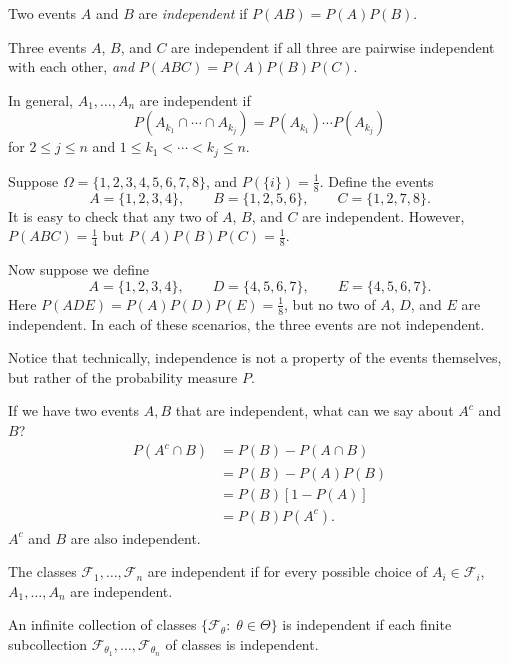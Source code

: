\documentclass[11pt,fleqn]{book} %
\begin{document}
\begin{definition} \label{def:independent-events}
	Two events $A$ and $B$ are \emph{independent} if $P(AB) = P(A)P(B)$.

	Three events $A$, $B$, and $C$ are independent if all three are pairwise independent with each other, \emph{and} $P(ABC)=P(A)P(B)P(C)$.

	In general, $A_1,\dots,A_n$ are independent if
	\[
		P \left( A_{k_1} \cap \cdots \cap A_{k_j} \right) = P \left( A_{k_1} \right) \cdots P \left( A_{k_j} \right)
	\]
	for $2 \leq j \leq n$ and $1 \leq k_1 < \cdots < k_j \leq n$.
\end{definition}

\begin{example} \label{ex:not-independent}
	Suppose $\Omega = \{1,2,3,4,5,6,7,8\}$, and $P(\{i\}) = \frac{1}{8}$. Define the events
	\[
		A = \{1,2,3,4\}, \qquad B = \{1,2,5,6\}, \qquad C = \{1,2,7,8\}.
	\]
	It is easy to check that any two of $A$, $B$, and $C$ are independent. However, $P(ABC) = \frac{1}{4}$ but $P(A)P(B)P(C) = \frac{1}{8}$.

	Now suppose we define
	\[
		A = \{1,2,3,4\}, \qquad D = \{4,5,6,7\}, \qquad E = \{4,5,6,7\}.
	\]
	Here $P(ADE) = P(A)P(D)P(E) = \frac{1}{8}$, but no two of $A$, $D$, and $E$ are independent. In each of these scenarios, the three events are not independent.
\end{example}

Notice that technically, independence is not a property of the events themselves, but rather of the probability measure $P$.

If we have two events $A,B$ that are independent, what can we say about $A^c$ and $B$?
\begin{align*}
	P(A^c \cap B) &= P(B) - P(A \cap B) \\
	&= P(B) - P(A)P(B) \\
	&= P(B)[1-P(A)] \\
	&= P(B)P(A^c).
\end{align*}
$A^c$ and $B$ are also independent.

\begin{definition} \label{def:independent-classes}
	The classes $\mathcal{F}_1,\dots,\mathcal{F}_n$ are independent if for every possible choice of $A_i \in \mathcal{F}_i$, $A_1,\dots,A_n$ are independent.

	An infinite collection of classes $\{\mathcal{F}_\theta:\;\theta \in \Theta\}$ is independent if each finite subcollection $\mathcal{F}_{\theta_1}, \dots, \mathcal{F}_{\theta_n}$ of classes is independent.
\end{definition}
\end{document}
